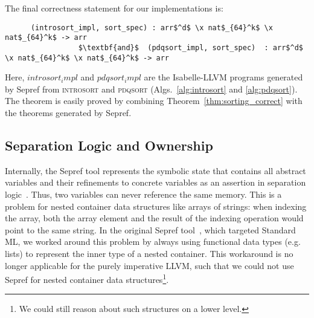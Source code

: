 \documentclass[runningheads]{llncs}
\begin{document}
  The final correctness statement for our implementations is:
  \begin{theorem}
    \begin{lstlisting}
      (introsort_impl, sort_spec) : arr$^d$ \x nat$_{64}^k$ \x nat$_{64}^k$ -> arr
                 $\textbf{and}$  (pdqsort_impl, sort_spec)  : arr$^d$ \x nat$_{64}^k$ \x nat$_{64}^k$ -> arr
    \end{lstlisting}
  \end{theorem}
  Here, \is$introsort_impl$ and \is$pdqsort_impl$ are the Isabelle-LLVM programs generated by Sepref from \textsc{introsort} and \textsc{pdqsort} (Algs.\ \ref{alg:introsort} and \ref{alg:pdqsort}).
  The theorem is easily proved by combining Theorem~\ref{thm:sorting_correct} with the theorems generated by Sepref.


  \subsection{Separation Logic and Ownership}
  Internally, the Sepref tool represents the symbolic state that contains all abstract variables and their refinements to concrete variables
  as an assertion in separation logic~\cite{Rey02,CHY07}. Thus, two variables can never reference the same memory.
  This is a problem for nested container data structures like arrays of strings: when indexing the array, both the array element and the result of
  the indexing operation would point to the same string.
  In the original Sepref tool~\cite{La15}, which targeted Standard ML, we worked around this problem by always using
  functional data types (e.g. lists) to represent the inner type of a nested container. This workaround is no longer applicable for the purely imperative LLVM, such that
  we could not use Sepref for nested container data structures\footnote{We could still reason about such structures on a lower level.}.
\end{document}
